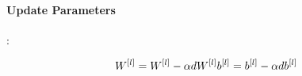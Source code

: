 \paragraph{Update Parameters}:

\begin{equation}
W^{[l]}=W^{[l]}-\alpha d W^{[l]} \\
b^{[l]}=b^{[l]}-\alpha d b^{[l]} \\
\end{equation}



\newpage